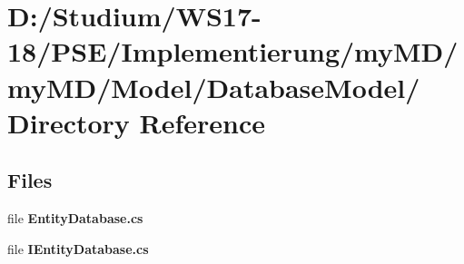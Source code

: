 \hypertarget{dir_D_3A_2FStudium_2FWS17_2D18_2FPSE_2FImplementierung_2FmyMD_2FmyMD_2FModel_2FDatabaseModel_2F}{
\section{D:/Studium/WS17-18/PSE/Implementierung/my\-MD/my\-MD/Model/Database\-Model/ Directory Reference}
\label{dir_D_3A_2FStudium_2FWS17_2D18_2FPSE_2FImplementierung_2FmyMD_2FmyMD_2FModel_2FDatabaseModel_2F}
}


\subsection*{Files}
\begin{CompactItemize}
\item 
file {\bf Entity\-Database.cs}
\item 
file {\bf IEntity\-Database.cs}
\end{CompactItemize}
